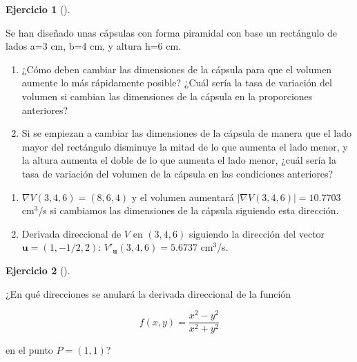 \documentclass[
  a4paper,
]{scrreport}
\theoremstyle{definition}
\newtheorem{exercise}{Ejercicio}[chapter]
\theoremstyle{remark}
\begin{document}
\begin{exercise}[]\protect\hypertarget{exr-derivada-direccional-capsulas}{}\label{exr-derivada-direccional-capsulas}

Se han diseñado unas cápsulas con forma piramidal con base un rectángulo
de lados a=3 cm, b=4 cm, y altura h=6 cm.

\begin{enumerate}
\def\labelenumi{\alph{enumi}.}
\item
  ¿Cómo deben cambiar las dimensiones de la cápsula para que el volumen
  aumente lo más rápidamente posible? ¿Cuál sería la tasa de variación
  del volumen si cambian las dimensiones de la cápsula en la
  proporciones anteriores?
\item
  Si se empiezan a cambiar las dimensiones de la cápsula de manera que
  el lado mayor del rectángulo disminuye la mitad de lo que aumenta el
  lado menor, y la altura aumenta el doble de lo que aumenta el lado
  menor, ¿cuál sería la tasa de variación del volumen de la cápsula en
  las condiciones anteriores?
\end{enumerate}

\end{exercise}

\begin{tcolorbox}[enhanced jigsaw, bottomrule=.15mm, breakable, colframe=quarto-callout-tip-color-frame, toprule=.15mm, opacityback=0, left=2mm, opacitybacktitle=0.6, colback=white, toptitle=1mm, titlerule=0mm, bottomtitle=1mm, arc=.35mm, title=\textcolor{quarto-callout-tip-color}{\faLightbulb}\hspace{0.5em}{Solución}, rightrule=.15mm, colbacktitle=quarto-callout-tip-color!10!white, leftrule=.75mm, coltitle=black]

\begin{enumerate}
\def\labelenumi{\alph{enumi}.}
\item
  \(\nabla V(3,4,6)=(8,6,4)\) y el volumen aumentará
  \(|\nabla V(3,4,6)|=10.7703\) cm\(^3\)/s si cambiamos las dimensiones
  de la cápsula siguiendo esta dirección.
\item
  Derivada direccional de \(V\) en \((3,4,6)\) siguiendo la dirección
  del vector \(\mathbf{u}=(1,-1/2,2)\): \(V'_\mathbf{u}(3,4,6)=5.6737\)
  cm\(^3\)/s.
\end{enumerate}

\end{tcolorbox}

\begin{exercise}[]\protect\hypertarget{exr-derivada-direccional-nula}{}\label{exr-derivada-direccional-nula}

¿En qué direcciones se anulará la derivada direccional de la función

\[
f(x,y)=\frac{x^2-y^2}{x^2+y^2}
\]

en el punto \(P=(1,1)\)?

\end{exercise}
\end{document}
